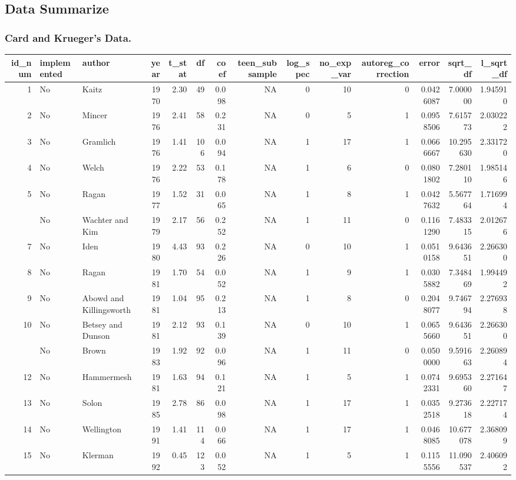 \documentclass[
]{article}
\begin{document}
\hypertarget{data-summarize}{%
\subsection{Data Summarize}\label{data-summarize}}

\hypertarget{card-and-kruegers-data.}{%
\subsubsection{Card and Krueger's Data.}\label{card-and-kruegers-data.}}

\begin{table}
\centering\begingroup\fontsize{11}{13}\selectfont

\begin{tabular}{rllrrrrrrrrrrr}
\toprule
id\_num & implemented & author & year & t\_stat & df & coef & teen\_subsample & log\_spec & no\_exp\_var & autoreg\_correction & error & sqrt\_df & l\_sqrt\_df\\
\midrule
1 & No & Kaitz & 1970 & 2.30 & 49 & 0.098 & NA & 0 & 10 & 0 & 0.0426087 & 7.000000 & 1.945910\\
2 & No & Mincer & 1976 & 2.41 & 58 & 0.231 & NA & 0 & 5 & 1 & 0.0958506 & 7.615773 & 2.030222\\
3 & No & Gramlich & 1976 & 1.41 & 106 & 0.094 & NA & 1 & 17 & 1 & 0.0666667 & 10.295630 & 2.331720\\
4 & No & Welch & 1976 & 2.22 & 53 & 0.178 & NA & 1 & 6 & 0 & 0.0801802 & 7.280110 & 1.985146\\
5 & No & Ragan & 1977 & 1.52 & 31 & 0.065 & NA & 1 & 8 & 1 & 0.0427632 & 5.567764 & 1.716994\\
\addlinespace
6 & No & Wachter and Kim & 1979 & 2.17 & 56 & 0.252 & NA & 1 & 11 & 0 & 0.1161290 & 7.483315 & 2.012676\\
7 & No & Iden & 1980 & 4.43 & 93 & 0.226 & NA & 0 & 10 & 1 & 0.0510158 & 9.643651 & 2.266300\\
8 & No & Ragan & 1981 & 1.70 & 54 & 0.052 & NA & 1 & 9 & 1 & 0.0305882 & 7.348469 & 1.994492\\
9 & No & Abowd and Killingsworth & 1981 & 1.04 & 95 & 0.213 & NA & 1 & 8 & 0 & 0.2048077 & 9.746794 & 2.276938\\
10 & No & Betsey and Dunson & 1981 & 2.12 & 93 & 0.139 & NA & 0 & 10 & 1 & 0.0655660 & 9.643651 & 2.266300\\
\addlinespace
11 & No & Brown & 1983 & 1.92 & 92 & 0.096 & NA & 1 & 11 & 0 & 0.0500000 & 9.591663 & 2.260894\\
12 & No & Hammermesh & 1981 & 1.63 & 94 & 0.121 & NA & 1 & 5 & 1 & 0.0742331 & 9.695360 & 2.271647\\
13 & No & Solon & 1985 & 2.78 & 86 & 0.098 & NA & 1 & 17 & 1 & 0.0352518 & 9.273618 & 2.227174\\
14 & No & Wellington & 1991 & 1.41 & 114 & 0.066 & NA & 1 & 17 & 1 & 0.0468085 & 10.677078 & 2.368099\\
15 & No & Klerman & 1992 & 0.45 & 123 & 0.052 & NA & 1 & 5 & 1 & 0.1155556 & 11.090537 & 2.406092\\
\bottomrule
\end{tabular}
\endgroup{}
\end{table}
\end{document}
